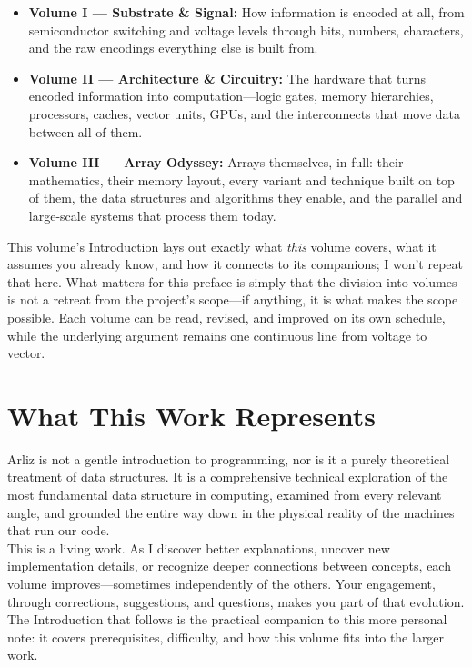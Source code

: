 \begin{itemize}
	\item \textbf{Volume I --- Substrate \& Signal:} How information is encoded at all, from semiconductor switching and voltage levels through bits, numbers, characters, and the raw encodings everything else is built from.
	\item \textbf{Volume II --- Architecture \& Circuitry:} The hardware that turns encoded information into computation---logic gates, memory hierarchies, processors, caches, vector units, GPUs, and the interconnects that move data between all of them.
	\item \textbf{Volume III --- Array Odyssey:} Arrays themselves, in full: their mathematics, their memory layout, every variant and technique built on top of them, the data structures and algorithms they enable, and the parallel and large-scale systems that process them today.
\end{itemize}

This volume's Introduction lays out exactly what \emph{this} volume covers, what it assumes you already know, and how it connects to its companions; I won't repeat that here. What matters for this preface is simply that the division into volumes is not a retreat from the project's scope---if anything, it is what makes the scope possible. Each volume can be read, revised, and improved on its own schedule, while the underlying argument remains one continuous line from voltage to vector.

\section*{What This Work Represents}

Arliz is not a gentle introduction to programming, nor is it a purely theoretical treatment of data structures. It is a comprehensive technical exploration of the most fundamental data structure in computing, examined from every relevant angle, and grounded the entire way down in the physical reality of the machines that run our code.\\
This is a living work. As I discover better explanations, uncover new implementation details, or recognize deeper connections between concepts, each volume improves---sometimes independently of the others. Your engagement, through corrections, suggestions, and questions, makes you part of that evolution. The Introduction that follows is the practical companion to this more personal note: it covers prerequisites, difficulty, and how this volume fits into the larger work.

